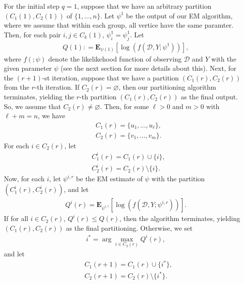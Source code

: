 \documentclass[12pt]{article}%
\begin{document}
For the initial step $q=1$, suppose that we have 
an arbitrary partition $(C_1(1), C_2(1))$ of $\{1,\ldots, n\}$. 
Let $\psi^1$ be the output of our EM algorithm, where we assume that within each group,
all vertice have the same paramter.  Then, for each pair $i, j \in C_k(1)$, $\psi_i^1 = \psi_j^1$.  
Let
\begin{eqnarray}
Q(1) : = \mathbf E_{\psi(1)}\left[\log(f(\mathcal D, Y;\psi^1))\right],
\end{eqnarray}
where $f(;\psi)$ denote the likelikehood function of observing $\mathcal D$ and $Y$ with the given parameter $\psi$ (see the next section for more details about this). 
Next, for the $(r+1)$-st iteration, suppose that we have a partition $(C_1(r), C_2(r))$ from the $r$-th iteration. 
If $C_2(r) = \varnothing$, then our partitioning algorithm terminates, yielding the $r$-th partition 
$(C_1(r), C_2(r))$ as the final output.  So, we assume that $C_2(r)\neq \varnothing$.  Then, for some $\ell > 0$ and $m > 0$ with $\ell + m = n$, we have 
\begin{eqnarray}
&C_1(r) = \{u_1,\ldots, u_\ell\},\\
&C_2(r) = \{v_1,\ldots, v_m\}.
\end{eqnarray} 
For each $i \in C_2(r)$, let 
\begin{eqnarray}
&C_1^{i}(r) = C_1(r) \cup \{i\}, \\
&C_2^{i}(r) = C_2(r) \setminus \{i\}.
\end{eqnarray}
Now, for each $i$, let $\psi^{i,r}$ be the EM estimate of $\psi$ with the partition $(C_1^{i}(r), C_2^{i}(r))$, and let 
\begin{eqnarray}
Q^{i}(r) = \mathbf E_{\psi^{i,r}}\left[\log(f(\mathcal D,Y;\psi^{i,r}))\right].
\end{eqnarray}
If for all $i \in C_2(r)$, $Q^{i}(r) \le Q(r)$, then the algorithm terminates, yielding 
$(C_1(r), C_2(r))$ as the final partitioning.  Otherwise, we set 
\begin{eqnarray}
i^* = \arg\max_{i \in C_2(r)} Q^{i}(r),
\end{eqnarray}
and let 
\begin{eqnarray}
&C_1(r+1) = C_1(r) \cup \{i^*\},\\
&C_2(r+1) = C_2(r) \setminus \{i^*\}.
\end{eqnarray}
\end{document}
